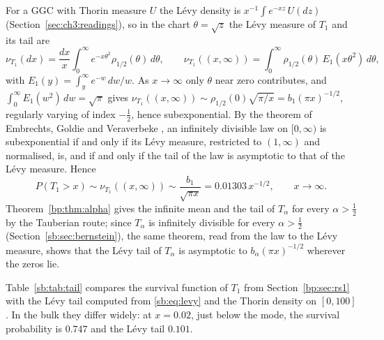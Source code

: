 For a GGC with Thorin measure $U$ the L\'evy density is $x^{-1}\int e^{-xz}\,U(dz)$ (Section~\ref{sec:ch3:readings}), so in the chart $\theta=\sqrt z$ the L\'evy measure of $T_1$ and its tail are
\begin{equation}\label{sb:eq:levy}
\nu_{T_1}(dx)=\frac{dx}x\int_0^\infty e^{-x\theta^2}\rho_{1/2}(\theta)\,d\theta,\qquad \nu_{T_1}((x,\infty))=\int_0^\infty\rho_{1/2}(\theta)\,E_1(x\theta^2)\,d\theta,
\end{equation}
with $E_1(y)=\int_y^\infty e^{-w}\,dw/w$. As $x\to\infty$ only $\theta$ near zero contributes, and $\int_0^\infty E_1(w^2)\,dw=\sqrt\pi$ gives $\nu_{T_1}((x,\infty))\sim\rho_{1/2}(0)\sqrt{\pi/x}=b_1(\pi x)^{-1/2}$, regularly varying of index $-\frac12$, hence subexponential. By the theorem of Embrechts, Goldie and Veraverbeke \cite{EGV79}, an infinitely divisible law on $[0,\infty)$ is subexponential if and only if its L\'evy measure, restricted to $(1,\infty)$ and normalised, is, and if and only if the tail of the law is asymptotic to that of the L\'evy measure. Hence
\begin{equation}\label{sb:eq:tail}
P(T_1>x)\sim\nu_{T_1}((x,\infty))\sim\frac{b_1}{\sqrt{\pi x}}=0.01303\,x^{-1/2},\qquad x\to\infty .
\end{equation}
Theorem~\ref{bp:thm:alpha} gives the infinite mean and the tail of $T_\alpha$ for every $\alpha>\frac12$ by the Tauberian route; since $T_\alpha$ is infinitely divisible for every $\alpha>\frac12$ (Section~\ref{sb:sec:bernstein}), the same theorem, read from the law to the L\'evy measure, shows that the L\'evy tail of $T_\alpha$ is asymptotic to $b_\alpha(\pi x)^{-1/2}$ wherever the zeros lie.

Table~\ref{sb:tab:tail} compares the survival function of $T_1$ from Section~\ref{bp:sec:rs1} with the L\'evy tail computed from \eqref{sb:eq:levy} and the Thorin density on $[0,100]$. In the bulk they differ widely: at $x=0.02$, just below the mode, the survival probability is $0.747$ and the L\'evy tail $0.101$.

